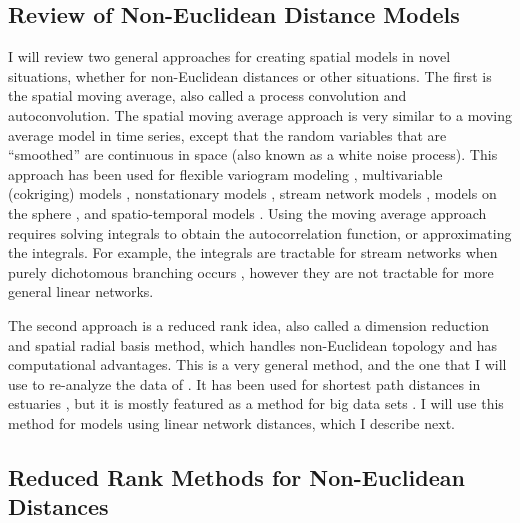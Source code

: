 \documentclass[11pt, titlepage]{article}\usepackage[]{graphicx}\usepackage[]{color}
\begin{document}
\begin{spacing}{1.9}
\begin{flushleft}
\subsection*{Review of Non-Euclidean Distance Models}

I will review two general approaches for creating spatial models in novel situations, whether for non-Euclidean distances or other situations.  The first is the spatial moving average, also called a process convolution and autoconvolution.  The spatial moving average approach is very similar to a moving average model in time series, except that the random variables that are ``smoothed'' are continuous in space (also known as a white noise process).  This approach has been used for flexible variogram modeling \citep{Barr:Ver:blac:1996}, multivariable (cokriging) models \citep{Ver:Barr:cons:1998,Ver:Cres:Barr:flex:2004}, nonstationary models \citep{Higd:proc:1998,Higd:Swal:Kern:non-:1999}, stream network models \citep{Ver:Pete:Theo:spat:2006, Cres:Frey:Harc:Smit:spat:2006, Ver:Pete:Move:2010}, models on the sphere \citep{Gnei:stri:2013}, and spatio-temporal models \citep{Wikl:kern:2002,Conn:John:Ver:spat:2015}. Using the moving average approach requires solving integrals to obtain the autocorrelation function, or approximating the integrals. For example, the integrals are tractable for stream networks when purely dichotomous branching occurs \citep{Ver:Pete:Theo:spat:2006}, however they are not tractable for more general linear networks. 

The second approach is a reduced rank idea, also called a dimension reduction \citep{Wikl:Cres:dime:1999} and spatial radial basis \citep{Lin:Chen:spat:2004, Hefl:Brom:Bros:Bude:basi:2016} method, which handles non-Euclidean topology and has computational advantages.  This is a very general method, and the one that I will use to re-analyze the data of \citet{Ladl:Avga:Whea:Boyc:pred:2016}.  It has been used for shortest path distances in estuaries \citep{Wang:Rana:low:2007}, but it is mostly featured as a method for big data sets \citep[e.g.][]{Wikl:Cres:dime:1999, Rupp:Wand:Carr:semi:2003, Cres:Gard:fixe:2008,Bane:Gelf:Finl:Sang:gaus:2008}.  I will use this method for models using linear network distances, which I describe next.


\subsection*{Reduced Rank Methods for Non-Euclidean Distances}


\end{flushleft}
\end{spacing}
\end{document}
